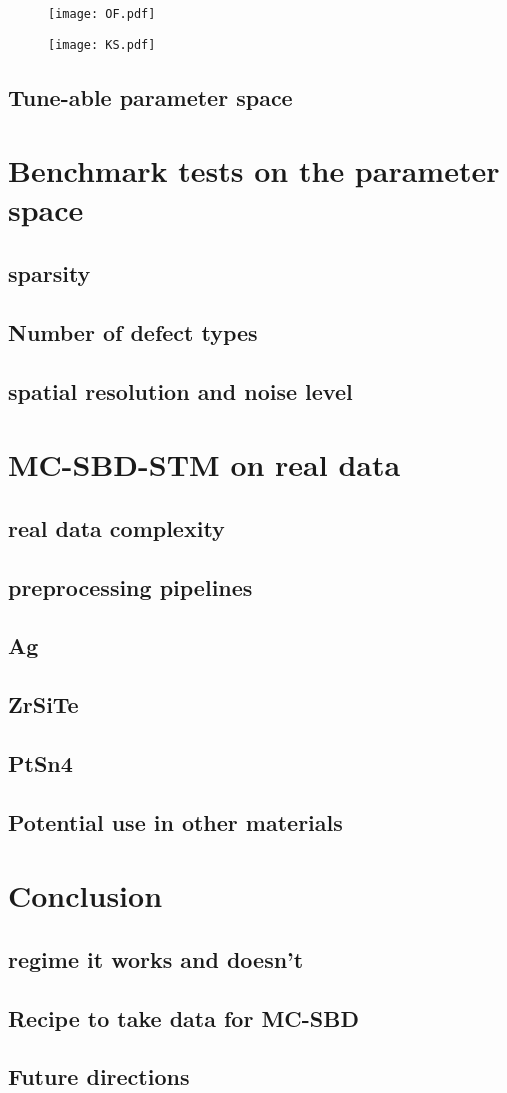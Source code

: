 \begin{figure}
	\texttt{[image: OF.pdf]} 
	\centering
	\caption{}
	\label{fig:OF}
\end{figure}
\begin{figure}
	\texttt{[image: KS.pdf]} 
	\centering
	\caption{}
	\label{fig:KS}
\end{figure}
\subsection{Tune-able parameter space}

\section{Benchmark tests on the parameter space}
\subsection{sparsity}
\subsection{Number of defect types}
\subsection{spatial resolution and noise level}

\section{MC-SBD-STM on real data}
\subsection{real data complexity}
\subsection{preprocessing pipelines}
\subsection{Ag}
\subsection{ZrSiTe}
\subsection{PtSn4}
\subsection{Potential use in other materials}

\section{Conclusion}
\subsection{regime it works and doesn't}
\subsection{Recipe to take data for MC-SBD}
\subsection{Future directions}